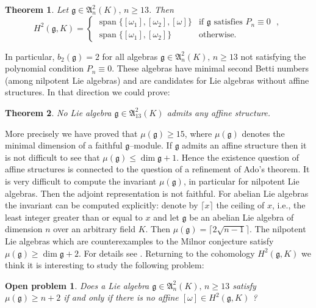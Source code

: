 \documentclass[12pt]{amsart}
\newtheorem{thm}{Theorem}[section]
\newtheorem*{prob*}{Open problem}
\theoremstyle{definition}
\theoremstyle{remark}
\DeclareMathOperator{\s}{span}
\newcommand{\Lg}{\mathfrak{g}}
\newcommand{\LA}{\mathfrak{A}}
\newcommand{\om}{\omega}
\begin{document}
\begin{thm}
Let $\Lg\in \LA^2_{n}(K),\, n\ge 13$. Then
\begin{equation*}
H^2(\Lg,K)=\begin{cases}
\s\{[\om_1],[\om_2],[\om]\} & \text{if $\Lg$ satisfies $P_n\equiv 0$ },\\[0.2cm]
\s\{[\om_1],[\om_2]\} & \text{otherwise}.
\end{cases}
\end{equation*} 
\end{thm}

In particular, $b_2(\Lg)=2$ for all algebras $\Lg\in \LA^2_n(K),\,n\ge 13$
not satisfying the polynomial condition $P_n\equiv 0$. 
These algebras have minimal second Betti numbers (among nilpotent Lie algebras)
and are candidates for Lie algebras without affine structures. In that direction
we could prove:

\begin{thm}
No Lie algebra $\Lg\in \LA^2_{13}(K)$ admits any affine structure.
\end{thm}

More precisely we have proved that $\mu (\Lg)\ge 15$, where $\mu (\Lg)$
denotes the minimal dimension of a faithful $\Lg$--module.
If $\Lg$ admits an affine structure then it is not difficult to see that
$\mu (\Lg)\le \dim \Lg +1$. Hence the existence question of affine structures
is connected to the question of a refinement of Ado's theorem.
It is very difficult to compute the invariant $\mu(\Lg)$, in particular
for nilpotent Lie algebras. Then the adjoint representation is not
faithful. 
For abelian Lie algebras the invariant can be computed explicitly:
denote by $\lceil x \rceil$ the ceiling of $x$, i.e., the least integer
greater than or equal to $x$ and let
$\Lg$ be an abelian Lie algebra of dimension $n$ over an arbitrary
field $K$. Then $\mu(\Lg)= \lceil 2\sqrt{n-1}\rceil $.     
The nilpotent Lie algebras which are counterexamples to
the Milnor conjecture satisfy $\mu (\Lg)\ge \dim \Lg +2$.
For details see \cite{BU5}.
Returning to the cohomology $H^2(\Lg,K)$ we think it is interesting 
to study the following problem:

\begin{prob*}
Does a Lie algebra $\Lg\in \LA^2_{n}(K),\, n\ge 13$ satisfy
$\mu(\Lg)\ge n+2$ if and only if there is no affine $[\om]\in H^2(\Lg,K)$ ?
\end{prob*}
\end{document}
